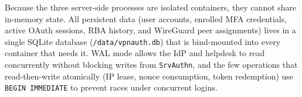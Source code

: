 Because the three server-side processes are isolated containers, they cannot
share in-memory state.
All persistent data (user accounts, enrolled MFA credentials, active OAuth
sessions, RBA history, and WireGuard peer assignments) lives in a single
SQLite database (\texttt{/data/vpnauth.db}) that is bind-mounted into every
container that needs it.
WAL mode allows the IdP and helpdesk to read concurrently without blocking
writes from \texttt{SrvAuthn}, and the few operations that read-then-write
atomically (IP lease, nonce consumption, token redemption) use
\texttt{BEGIN IMMEDIATE} to prevent races under concurrent logins.
